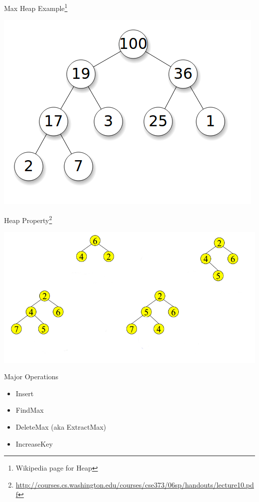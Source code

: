 \documentclass{beamer}
\begin{document}
\begin{frame}{Max Heap Example\footnote{Wikipedia page for Heap}}
    \begin{center}
        \includegraphics[scale=0.4]{maxHeapEg.png}
    \end{center}
\end{frame}


\begin{frame}{Heap Property\footnote{\url{http://courses.cs.washington.edu/courses/cse373/06sp/handouts/lecture10.pdf}}}
    \begin{center}
        \includegraphics[scale=0.4]{heapOrNot.png}
    \end{center}
\end{frame}

\begin{frame}{Major Operations}
    \begin{itemize}
        \item Insert
        \item FindMax 
        \item DeleteMax (aka ExtractMax)
        \item IncreaseKey
    \end{itemize}
\end{frame}
\end{document}
